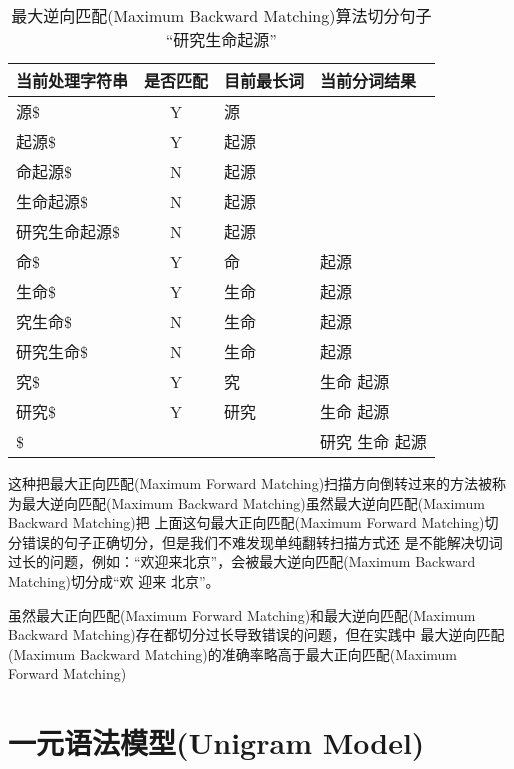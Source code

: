 \documentclass[11pt,a4paper]{article}
\def\maxforward{最大正向匹配(Maximum Forward Matching)}
\def\maxbackward{最大逆向匹配(Maximum Backward Matching)}
\def\UniGram{一元语法模型(Unigram Model)}
\begin{document}
\begin{table}
\caption{\maxbackward 算法切分句子 “研究生命起源”}
\label{tbl_maxbackward}
	\begin{center}
		\begin{tabular}{l|c|l|l}
			当前处理字符串           & 是否匹配 & 目前最长词 & 当前分词结果   \\
			\hline
			源\$                     &  Y  & 源         &                \\
			起源\$                   &  Y  & 起源       &                \\
			命起源\$                 &  N  & 起源       &                \\
			生命起源\$               &  N  & 起源       &                \\
			研究生命起源\$           &  N  & 起源       &                \\

			命\$                     &  Y  & 命         & 起源           \\
			生命\$                   &  Y  & 生命       & 起源           \\
			究生命\$                 &  N  & 生命       & 起源           \\
			研究生命\$               &  N  & 生命       & 起源           \\

			究\$                     &  Y  & 究         & 生命 起源      \\
			研究\$                   &  Y  & 研究       & 生命 起源      \\

			\$                       &          &            & 研究 生命 起源 \\
		\end{tabular}
	\end{center}
\end{table}

这种把\maxforward 扫描方向倒转过来的方法被称为\maxbackward 虽然\maxbackward 把
上面这句\maxforward 切分错误的句子正确切分，但是我们不难发现单纯翻转扫描方式还
是不能解决切词过长的问题，例如：“欢迎来北京”，会被\maxbackward 切分成“欢 迎来 北京”。

虽然\maxforward 和\maxbackward 存在都切分过长导致错误的问题，但在实践中
\maxbackward 的准确率略高于\maxforward

\section{\UniGram}
\end{document}
